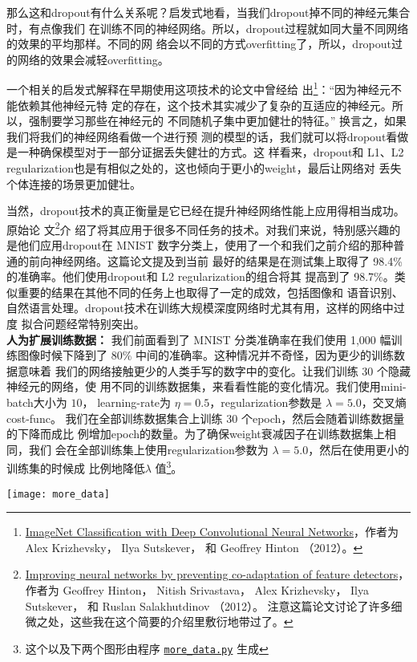 那么这和\gls*{dropout}有什么关系呢？启发式地看，当我们\gls*{dropout}掉不同的神经元集合时，有点像我们
在训练不同的神经网络。所以，\gls*{dropout}过程就如同大量不同网络的效果的平均那样。不同的网
络会以不同的方式\gls*{overfitting}了，所以，\gls*{dropout}过的网络的效果会减轻\gls*{overfitting}。

一个相关的启发式解释\label{dropout_explanation}在早期使用这项技术的论文中曾经给
出\footnote{\href{https://papers.nips.cc/paper/4824-imagenet-classification-with-deep-convolutional-neural-networks.pdf}{ImageNet
    Classification with Deep Convolutional Neural Networks}，作者为 Alex Krizhevsky，
  Ilya Sutskever， 和 Geoffrey Hinton （2012）。}：“因为神经元不能依赖其他神经元特
定的存在，这个技术其实减少了复杂的互适应的神经元。所以，强制要学习那些在神经元的
不同随机子集中更加健壮的特征。” 换言之，如果我们将我们的神经网络看做一个进行预
测的模型的话，我们就可以将\gls*{dropout}看做是一种确保模型对于一部分证据丢失健壮的方式。这
样看来，\gls*{dropout}和 L1、L2 \gls*{regularization}也是有相似之处的，这也倾向于更小的\gls*{weight}，最后让网络对
丢失个体连接的场景更加健壮。

当然，\gls*{dropout}技术的真正衡量是它已经在提升神经网络性能上应用得相当成功。原始论
文\footnote{\href{http://arxiv.org/pdf/1207.0580.pdf}{Improving neural networks
    by preventing co-adaptation of feature detectors}， 作者为 Geoffrey Hinton， Nitish
  Srivastava， Alex Krizhevsky， Ilya Sutskever， 和 Ruslan Salakhutdinov
  （2012）。 注意这篇论文讨论了许多细微之处，这些我在这个简要的介绍里敷衍地带过了。}介
绍了将其应用于很多不同任务的技术。对我们来说，特别感兴趣的是他们应用\gls*{dropout}在 MNIST
数字分类上，使用了一个和我们之前介绍的那种普通的前向神经网络。这篇论文提及到当前
最好的结果是在测试集上取得了 98.4\% 的准确率。他们使用\gls*{dropout}和 L2 \gls*{regularization}的组合将其
提高到了 98.7\%。类似重要的结果在其他不同的任务上也取得了一定的成效，包括图像和
语音识别、自然语言处理。\gls*{dropout}技术在训练大规模深度网络时尤其有用，这样的网络中过度
拟合问题经常特别突出。\\

\textbf{人为扩展训练数据：} 我们前面看到了 MNIST 分类准确率在我们使用 1,000 幅训
练图像时候下降到了 80\% 中间的准确率。这种情况并不奇怪，因为更少的训练数据意味着
我们的网络接触更少的人类手写的数字中的变化。让我们训练 30 个隐藏神经元的网络，使
用不同的训练数据集，来看看性能的变化情况。我们使用\gls*{mini-batch}大小为 $10$，%
\gls*{learning-rate}为 $\eta=0.5$，\gls*{regularization}参数是 $\lambda=5.0$，交叉熵\gls*{cost-func}。
我们在全部训练数据集合上训练 30 个\gls*{epoch}，然后会随着训练数据量的下降而成比
例增加\gls*{epoch}的数量。为了确保\gls*{weight}衰减因子在训练数据集上相同，我们
会在全部训练集上使用\gls*{regularization}参数为 $\lambda = 5.0$，然后在使用更小的训练集的时候成
比例地降低$\lambda$ 值\footnote{这个以及下两个图形由程序
  \href{https://github.com/mnielsen/neural-networks-and-deep-learning/blob/master/fig/more_data.py}{\lstinline!more_data.py!}
  生成}。
\begin{center}
\texttt{[image: more\_data]}
\end{center}


